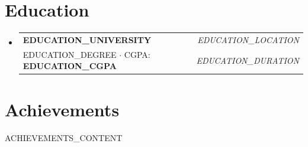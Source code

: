 \documentclass[letterpaper,10pt]{article}
\makeatletter
\newcommand{\resumeSubheading}[4]{
  \vspace{-1pt}\item
    \begin{tabular*}{0.97\textwidth}[t]{l@{\extracolsep{\fill}}r}
      \textbf{#1} & \textit{\small #2} \\
      \small#3 & \textit{\small #4} \\
    \end{tabular*}\vspace{3pt}
}
\newcommand{\resumeSubHeadingListStart}{\begin{itemize}[leftmargin=0.15in, label={}]}
\newcommand{\resumeSubHeadingListEnd}{\end{itemize}}
\makeatother
\begin{document}
\section*{\textbf{Education}}
\vspace{1.5mm}
\resumeSubHeadingListStart
  \resumeSubheading
    {{{EDUCATION_UNIVERSITY}}}{{{EDUCATION_LOCATION}}}
    {{{EDUCATION_DEGREE}} $\cdot$ CGPA: \textbf{{{EDUCATION_CGPA}}}}{{{EDUCATION_DURATION}}}
\resumeSubHeadingListEnd
\vspace{-2.5mm}

\section*{\textbf{Achievements}}
\vspace{1.5mm}
\begin{itemize}[leftmargin=*, noitemsep, topsep=0pt]
{{ACHIEVEMENTS_CONTENT}}
\end{itemize}
\end{document}
